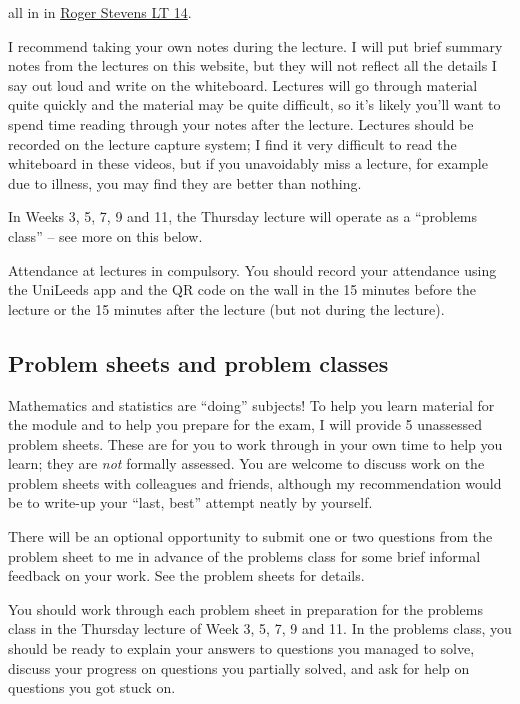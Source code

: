 \documentclass[
  letterpaper,
  DIV=11,
  numbers=noendperiod]{scrreprt}
\theoremstyle{plain}
\theoremstyle{definition}
\theoremstyle{definition}
\theoremstyle{remark}
\begin{document}
all in in
\href{https://students.leeds.ac.uk/buildings-and-rooms/3611/roger-stevens-lt-14-10m-14}{Roger
Stevens LT 14}.

I recommend taking your own notes during the lecture. I will put brief
summary notes from the lectures on this website, but they will not
reflect all the details I say out loud and write on the whiteboard.
Lectures will go through material quite quickly and the material may be
quite difficult, so it's likely you'll want to spend time reading
through your notes after the lecture. Lectures should be recorded on the
lecture capture system; I find it very difficult to read the whiteboard
in these videos, but if you unavoidably miss a lecture, for example due
to illness, you may find they are better than nothing.

In Weeks 3, 5, 7, 9 and 11, the Thursday lecture will operate as a
``problems class'' -- see more on this below.

Attendance at lectures in compulsory. You should record your attendance
using the UniLeeds app and the QR code on the wall in the 15 minutes
before the lecture or the 15 minutes after the lecture (but not during
the lecture).

\subsection*{Problem sheets and problem
classes}\label{problem-sheets-and-problem-classes}

Mathematics and statistics are ``doing'' subjects! To help you learn
material for the module and to help you prepare for the exam, I will
provide 5 unassessed problem sheets. These are for you to work through
in your own time to help you learn; they are \emph{not} formally
assessed. You are welcome to discuss work on the problem sheets with
colleagues and friends, although my recommendation would be to write-up
your ``last, best'' attempt neatly by yourself.

There will be an optional opportunity to submit one or two questions
from the problem sheet to me in advance of the problems class for some
brief informal feedback on your work. See the problem sheets for
details.

You should work through each problem sheet in preparation for the
problems class in the Thursday lecture of Week 3, 5, 7, 9 and 11. In the
problems class, you should be ready to explain your answers to questions
you managed to solve, discuss your progress on questions you partially
solved, and ask for help on questions you got stuck on.
\end{document}
